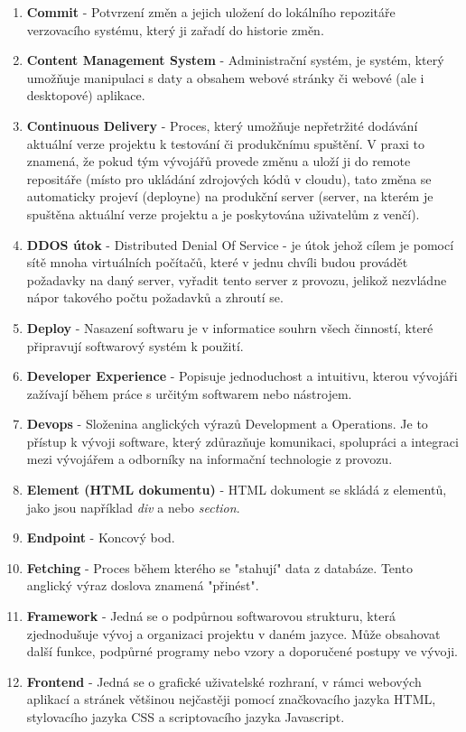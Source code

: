 \documentclass[12pt,a4paper]{report}
\begin{document}
\begin{enumerate}
    \item \textbf{Commit} - Potvrzení změn a jejich uložení do lokálního repozitáře verzovacího systému, který ji zařadí do historie změn.
    \item \textbf{Content Management System} - Administrační systém, je systém, který umožňuje manipulaci s daty a obsahem webové stránky či webové (ale i desktopové) aplikace.
    \item \textbf{Continuous Delivery} -  Proces, který umožňuje nepřetržité dodávání aktuální verze projektu k testování či produkčnímu spuštění. V praxi to znamená, že pokud tým vývojářů provede změnu a uloží ji do remote repositáře (místo pro ukládání zdrojových kódů v cloudu), tato změna se automaticky projeví (deployne) na produkční server (server, na kterém je spuštěna aktuální verze projektu a je poskytována uživatelům z venčí).
    \item \textbf{DDOS útok} - Distributed Denial Of Service - je útok jehož cílem je pomocí sítě mnoha virtuálních počítačů, které v jednu chvíli budou provádět požadavky na daný server, vyřadit tento server z provozu, jelikož nezvládne nápor takového počtu požadavků a zhroutí se.
    \item \textbf{Deploy} - Nasazení softwaru je v informatice souhrn všech činností, které připravují softwarový systém k použití.
    \item \textbf{Developer Experience} - Popisuje jednoduchost a intuitivu, kterou vývojáři zažívají během práce s určitým softwarem nebo nástrojem.
    \item \textbf{Devops} - Složenina anglických výrazů Development a Operations. Je to přístup k vývoji software, který zdůrazňuje komunikaci, spolupráci a integraci mezi vývojářem a odborníky na informační technologie z provozu. 
    \item \textbf{Element (HTML dokumentu)} - HTML dokument se skládá z elementů, jako jsou například \emph{div} a nebo \emph{section}.
    \item \textbf{Endpoint} - Koncový bod. 
    \item \textbf{Fetching} - Proces během kterého se "stahují" data z databáze. Tento anglický výraz doslova znamená "přinést".
    \item \textbf{Framework} - Jedná se o podpůrnou softwarovou strukturu, která zjednodušuje vývoj a organizaci projektu v daném jazyce. Může obsahovat další funkce, podpůrné programy nebo vzory a doporučené postupy ve vývoji.
    \item \textbf{Frontend} - Jedná se o grafické uživatelské rozhraní, v rámci webových aplikací a stránek většinou nejčastěji pomocí značkovacího jazyka HTML, stylovacího jazyka CSS a scriptovacího jazyka Javascript.

\end{enumerate}
\end{document}
